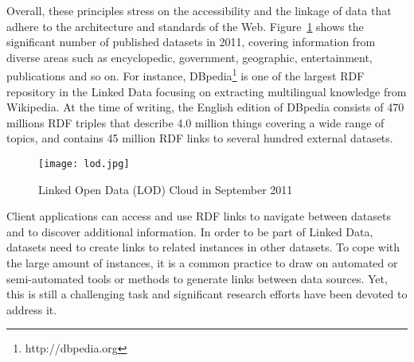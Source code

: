 Overall, these principles stress on the accessibility and the linkage of data that adhere to the architecture and standards of the Web. Figure~\ref{fig:lod} shows the significant number of published datasets in 2011, covering information from diverse areas such as encyclopedic, government, geographic, entertainment, publications and so on.  For instance, DBpedia\footnote{http://dbpedia.org} is one of the largest RDF repository in the Linked Data focusing on extracting multilingual knowledge from Wikipedia. At the time of writing, the English edition of DBpedia consists of 470 millions RDF triples that describe 4.0 million things covering a wide range of topics, and contains 45 million RDF links to several hundred external datasets.

 \begin{figure}[htbp]
   \centering
  \texttt{[image: lod.jpg]}
  \caption{Linked Open Data (LOD) Cloud in September 2011}
  \label{fig:lod}
 \end{figure}

Client applications can access and use RDF links to navigate between datasets and to discover additional information. In order to be part of Linked Data, datasets need to create links to related instances in other datasets. To cope with the large amount of instances, it is a common practice to draw on automated or semi-automated tools or methods to generate links between data sources. Yet, this is still a challenging task and significant research efforts have been devoted to address it.


